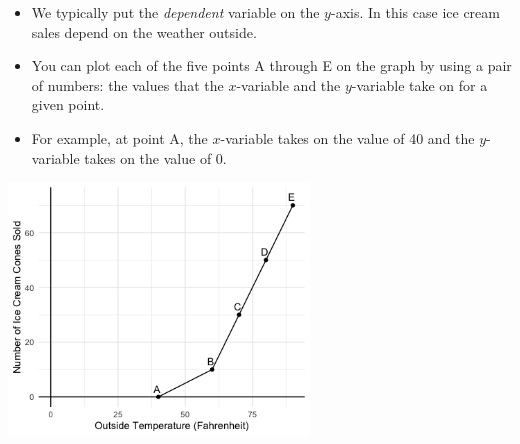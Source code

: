 \documentclass{beamer}
\begin{document}
\begin{frame}

\begin{itemize}
  \item We typically put the \textit{dependent} variable on the $y$-axis. In this case ice cream sales depend on the weather outside.
  \item You can plot each of the five points A through E on the graph by using a pair of numbers: the values that the $x$-variable and the $y$-variable take on for a given point.
  \item For example, at point A, the $x$-variable takes on the value of 40 and the $y$-variable takes on the value of 0.
\end{itemize}

\begin{center}
\includegraphics[width = 0.6\textwidth]{IceCreamSales.png}
\end{center}
\end{frame}
\end{document}
